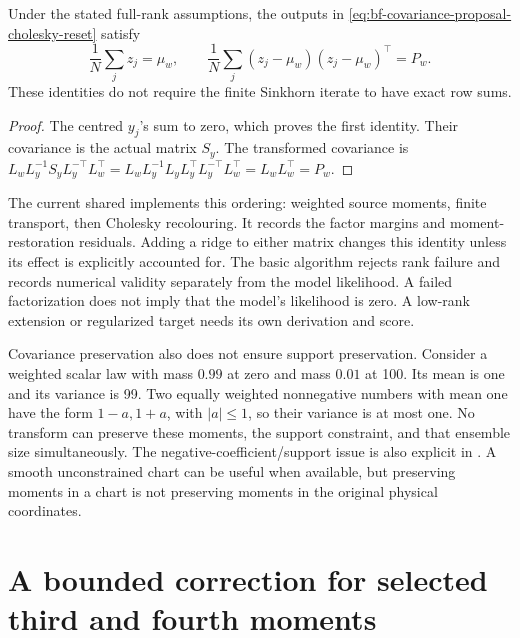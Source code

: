 \begin{proposition}
Under the stated full-rank assumptions, the outputs in
\eqref{eq:bf-covariance-proposal-cholesky-reset} satisfy
\begin{equation}
\label{eq:bf-covariance-proposal-reset-covariance}
 \frac1N\sum_jz_j=\mu_w,\qquad
 \frac1N\sum_j(z_j-\mu_w)(z_j-\mu_w)^\top=P_w .
\end{equation}
These identities do not require the finite Sinkhorn iterate to have exact
row sums.
\end{proposition}
\begin{proof}
The centred \(y_j\)'s sum to zero, which proves the first identity.
Their covariance is the actual matrix \(S_y\). The transformed covariance is
\(L_wL_y^{-1}S_yL_y^{-\top}L_w^\top
 =L_wL_y^{-1}L_yL_y^\top L_y^{-\top}L_w^\top
 =L_wL_w^\top=P_w\).
\end{proof}

The current shared  implements this ordering: weighted
source moments, finite transport, then Cholesky recolouring. It records the
factor margins and moment-restoration residuals. Adding a ridge to either matrix changes this
identity unless its effect is explicitly accounted for. The basic algorithm
rejects rank failure and records numerical validity separately from the
model likelihood. A failed factorization does not imply that the model's
likelihood is zero. A low-rank extension or regularized target needs its own
derivation and score.

Covariance preservation also does not ensure support preservation.
Consider a weighted scalar law with mass \(0.99\) at zero and mass \(0.01\)
at 100. Its mean is one and its variance is 99. Two equally weighted
nonnegative numbers with mean one have the form \(1-a,1+a\), with
\(|a|\leq1\), so their variance is at most one. No transform can preserve
these moments, the support constraint, and that ensemble size simultaneously.
The negative-coefficient/support issue is also explicit in
\citet[Section 7.3]{acevedodewiljesreich2017secondorder}. A smooth unconstrained chart can be useful
when available, but preserving moments in a chart is not preserving moments
in the original physical coordinates.

\section[Bounded higher-moment correction]{A bounded correction for selected third and fourth moments}

